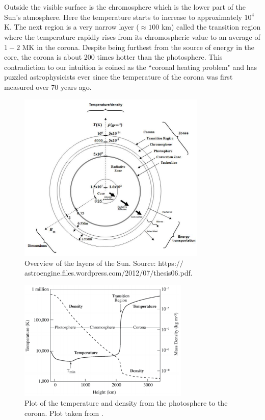 \documentclass[12pt,a4paper,twoside]{article}
\begin{document}
\\ \\ Outside the visible surface is the chromosphere which is the lower part of the Sun's atmosphere. Here the temperature starts to increase to approximately $10^4$ K. The next region is a very narrow layer ($\approx 100$ km) called the transition region where the temperature rapidly rises from its chromospheric value to an average of $1-2$ MK in the corona. Despite being furthest from the source of energy in the core, the corona is about 200 times hotter than the photosphere. This contradiction to our intuition is coined as the ``coronal heating problem" and has puzzled astrophysicists ever since the temperature of the corona was first measured over 70 years ago.   
\begin{figure}
\centering
\includegraphics[width = 0.8\textwidth]{on}
\caption{Overview of the layers of the Sun. Source: https:$//$astroengine.files.wordpress.com$/$2012$/$07$/$thesis06.pdf.}
\label{fig_1}
\end{figure}
\begin{figure}
\centering
\includegraphics[width = 0.725\textwidth]{T_regoins}
\caption{Plot of the temperature and density from the photosphere to the corona. Plot taken from \cite{Lang_2006ses}.}
\label{fig_1a}
\end{figure}
\end{document}
